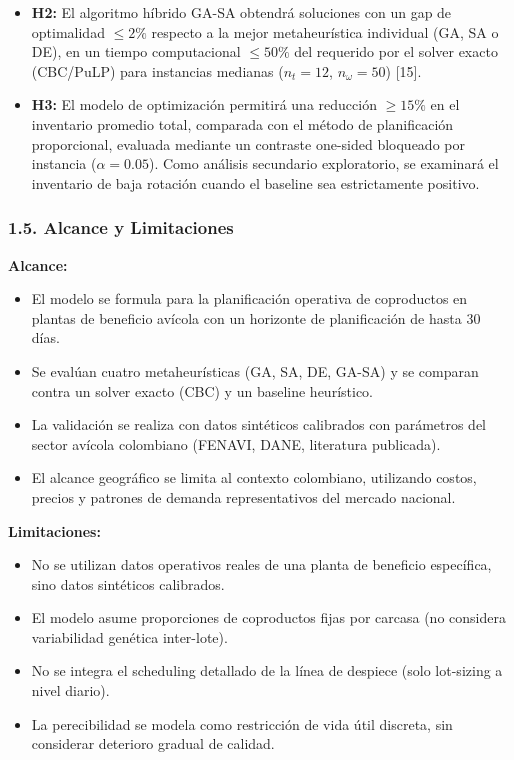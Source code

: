 \documentclass[
  spanish,
  12pt,
]{article}
\providecommand{\tightlist}{%
  \setlength{\itemsep}{0pt}\setlength{\parskip}{0pt}}
\begin{document}
\begin{itemize}
\tightlist
\item
  \textbf{H2:} El algoritmo híbrido GA-SA obtendrá soluciones con un gap
  de optimalidad \textbf{\(\leq 2\%\)} respecto a la mejor
  metaheurística individual (GA, SA o DE), en un tiempo computacional
  \textbf{\(\leq 50\%\)} del requerido por el solver exacto (CBC/PuLP)
  para instancias medianas (\(n_t=12\), \(n_\omega=50\)) {[}15{]}.
\item
  \textbf{H3:} El modelo de optimización permitirá una reducción
  \textbf{\(\geq 15\%\)} en el inventario promedio total, comparada con
  el método de planificación proporcional, evaluada mediante un
  contraste one-sided bloqueado por instancia (\(\alpha=0.05\)). Como
  análisis secundario exploratorio, se examinará el inventario de baja
  rotación cuando el baseline sea estrictamente positivo.
\end{itemize}

\subsubsection{1.5. Alcance y
Limitaciones}\label{alcance-y-limitaciones}

\textbf{Alcance:}

\begin{itemize}
\tightlist
\item
  El modelo se formula para la planificación operativa de coproductos en
  plantas de beneficio avícola con un horizonte de planificación de
  hasta 30 días.
\item
  Se evalúan cuatro metaheurísticas (GA, SA, DE, GA-SA) y se comparan
  contra un solver exacto (CBC) y un baseline heurístico.
\item
  La validación se realiza con datos sintéticos calibrados con
  parámetros del sector avícola colombiano (FENAVI, DANE, literatura
  publicada).
\item
  El alcance geográfico se limita al contexto colombiano, utilizando
  costos, precios y patrones de demanda representativos del mercado
  nacional.
\end{itemize}

\textbf{Limitaciones:}

\begin{itemize}
\tightlist
\item
  No se utilizan datos operativos reales de una planta de beneficio
  específica, sino datos sintéticos calibrados.
\item
  El modelo asume proporciones de coproductos fijas por carcasa (no
  considera variabilidad genética inter-lote).
\item
  No se integra el scheduling detallado de la línea de despiece (solo
  lot-sizing a nivel diario).
\item
  La perecibilidad se modela como restricción de vida útil discreta, sin
  considerar deterioro gradual de calidad.
\end{itemize}
\end{document}
